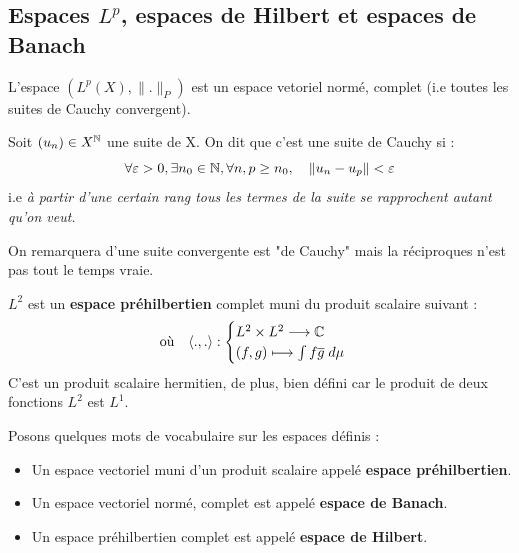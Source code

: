 \newpage 

\subsection{Espaces $L^p$, espaces de Hilbert et espaces de Banach}

\begin{theorem}
    L'espace $(L^p(X), \|.\|_P)$ est un espace vetoriel normé, complet
    (i.e toutes les suites de Cauchy convergent).
\end{theorem}

\begin{remark}
    Soit $(u_n) \in X^{\mathbb{N}}$ une suite de X. On dit que c'est une suite de Cauchy si :
        \[ \forall \varepsilon > 0, \exists n_0 \in \mathbb{N}, \forall n,p \geq n_0, \quad \| u_n - u_p\| < \varepsilon \] 
    i.e \emph{à partir d'une certain rang tous les termes de la suite se rapprochent autant qu'on veut.}
    
    On remarquera d'une suite convergente est "de Cauchy" mais la réciproques n'est pas tout le temps vraie. 
\end{remark}

\begin{theorem}[Structure de $L^2$]
    $L^2$ est un \textbf{espace préhilbertien} complet muni du produit scalaire suivant :
    \[ \text{où} \quad \langle .,. \rangle : 
        \begin{cases}
            L^2 \times L^2 \longrightarrow \mathbb{C} \\ 
            (f,g) \longmapsto \int f \overline{g} \; d \mu 
        \end{cases}
    \]
    C'est un produit scalaire hermitien, de plus, bien défini car le produit de deux fonctions $L^2$ est $L^1$. 
\end{theorem}

\begin{remark} Posons quelques mots de vocabulaire sur les espaces définis :
    \begin{itemize}
        \item Un espace vectoriel muni d'un produit scalaire appelé \textbf{espace préhilbertien}.
        \item Un espace vectoriel normé, complet est appelé \textbf{espace de Banach}. 
        \item Un espace préhilbertien complet est appelé \textbf{espace de Hilbert}.
    \end{itemize}
\end{remark}

